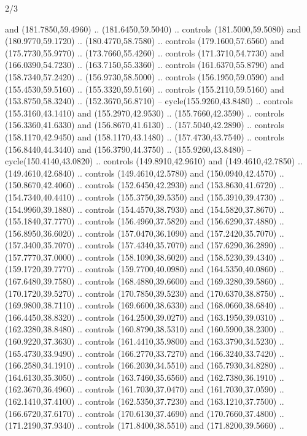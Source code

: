 \begin{flagdescription}{2/3}
\begin{scope}[xshift=0.5\flaglength,yshift=0.5\flagwidth,scale=\stretchfactor]
\begin{scope}[scale=0.001645\flagwidth,yshift=65mm,xshift=-63mm]
\begin{scope}[y=0.80pt, x=0.80pt, yscale=-1,]
\begin{scope}[cm={{1.33333,0.0,0.0,1.33333,(0.0,1e-05)}}]
  and (181.7850,59.4960) .. (181.6450,59.5040) .. controls (181.5000,59.5080)
  and (180.9770,59.1720) .. (180.4770,58.7580) .. controls (179.1600,57.6560)
  and (175.7730,55.9770) .. (173.7660,55.4260) .. controls (171.3710,54.7730)
  and (166.0390,54.7230) .. (163.7150,55.3360) .. controls (161.6370,55.8790)
  and (158.7340,57.2420) .. (156.9730,58.5000) .. controls (156.1950,59.0590)
  and (155.4530,59.5160) .. (155.3320,59.5160) .. controls (155.2110,59.5160)
  and (153.8750,58.3240) .. (152.3670,56.8710) -- cycle(155.9260,43.8480) ..
  controls (155.3160,43.1410) and (155.2970,42.9530) .. (155.7660,42.3590) ..
  controls (156.3360,41.6330) and (156.8670,41.6130) .. (157.5040,42.2890) ..
  controls (158.1170,42.9450) and (158.1170,43.1480) .. (157.4730,43.7540) ..
  controls (156.8440,44.3440) and (156.3790,44.3750) .. (155.9260,43.8480) --
  cycle(150.4140,43.0820) .. controls (149.8910,42.9610) and (149.4610,42.7850)
  .. (149.4610,42.6840) .. controls (149.4610,42.5780) and (150.0940,42.4570) ..
  (150.8670,42.4060) .. controls (152.6450,42.2930) and (153.8630,41.6720) ..
  (154.7340,40.4410) .. controls (155.3750,39.5350) and (155.3910,39.4730) ..
  (154.9960,39.1880) .. controls (154.4570,38.7930) and (154.5820,37.8670) ..
  (155.1840,37.7770) .. controls (156.4960,37.5820) and (156.6290,37.4880) ..
  (156.8950,36.6020) .. controls (157.0470,36.1090) and (157.2420,35.7070) ..
  (157.3400,35.7070) .. controls (157.4340,35.7070) and (157.6290,36.2890) ..
  (157.7770,37.0000) .. controls (158.1090,38.6020) and (158.5230,39.4340) ..
  (159.1720,39.7770) .. controls (159.7700,40.0980) and (164.5350,40.0860) ..
  (167.6480,39.7580) .. controls (168.4880,39.6600) and (169.3280,39.5860) ..
  (170.1720,39.5270) .. controls (170.7850,39.5230) and (170.6370,38.8750) ..
  (169.9800,38.7110) .. controls (169.6600,38.6330) and (168.0660,38.6840) ..
  (166.4450,38.8320) .. controls (164.2500,39.0270) and (163.1950,39.0310) ..
  (162.3280,38.8480) .. controls (160.8790,38.5310) and (160.5900,38.2300) ..
  (160.9220,37.3630) .. controls (161.4410,35.9800) and (163.3790,34.5230) ..
  (165.4730,33.9490) .. controls (166.2770,33.7270) and (166.3240,33.7420) ..
  (166.2580,34.1910) .. controls (166.2030,34.5510) and (165.7930,34.8280) ..
  (164.6130,35.3050) .. controls (163.7460,35.6560) and (162.7380,36.1910) ..
  (162.3670,36.4960) .. controls (161.7030,37.0470) and (161.7030,37.0590) ..
  (162.1410,37.4100) .. controls (162.5350,37.7230) and (163.1210,37.7500) ..
  (166.6720,37.6170) .. controls (170.6130,37.4690) and (170.7660,37.4800) ..
  (171.2190,37.9340) .. controls (171.8400,38.5510) and (171.8200,39.5660) ..

\end{scope}
\end{scope}
\end{scope}
\end{scope}
\end{flagdescription}
